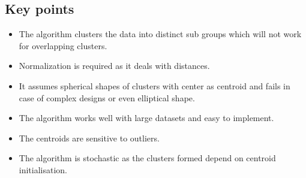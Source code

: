 \documentclass[12pt,letterpaper, onecolumn]{exam}
\begin{document}
\subsection*{ Key points}
\begin{itemize}
\item The algorithm clusters the data into distinct sub groups which will not work for overlapping clusters.
\item Normalization is required as it deals with distances.
\item It assumes spherical shapes of clusters with center as  centroid and fails in case of complex designs or even elliptical shape.
\item The algorithm works well with large datasets and easy to implement.
\item The centroids are sensitive to outliers.
\item The algorithm is stochastic as the clusters formed depend on centroid initialisation.
\end{itemize}
\end{document}
